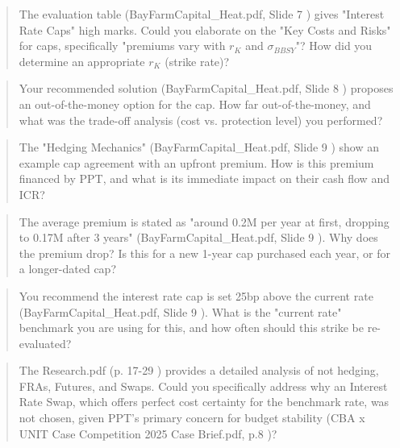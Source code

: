 \documentclass[11pt, a4paper, british]{article}
\begin{document}
\newpage

\begin{quote}
    The evaluation table (BayFarmCapital_Heat.pdf, Slide 7 ) gives "Interest Rate Caps" high marks. Could you elaborate on the "Key Costs and Risks" for caps, specifically "premiums vary with $r_K$ and $\sigma_{BBSY}$"? How did you determine an appropriate $r_K$ (strike rate)?
\end{quote}

\newpage

\begin{quote}
    Your recommended solution (BayFarmCapital_Heat.pdf, Slide 8 ) proposes an out-of-the-money option for the cap. How far out-of-the-money, and what was the trade-off analysis (cost vs. protection level) you performed?
\end{quote}

\newpage

\begin{quote}
    The "Hedging Mechanics" (BayFarmCapital_Heat.pdf, Slide 9 ) show an example cap agreement with an upfront premium. How is this premium financed by PPT, and what is its immediate impact on their cash flow and ICR?
\end{quote}

\newpage

\begin{quote}
    The average premium is stated as "around 0.2M per year at first, dropping to 0.17M after 3 years" (BayFarmCapital_Heat.pdf, Slide 9 ). Why does the premium drop? Is this for a new 1-year cap purchased each year, or for a longer-dated cap?
\end{quote}

\newpage

\begin{quote}
    You recommend the interest rate cap is set 25bp above the current rate (BayFarmCapital_Heat.pdf, Slide 9 ). What is the "current rate" benchmark you are using for this, and how often should this strike be re-evaluated?
\end{quote}

\newpage

\begin{quote}
    The Research.pdf (p. 17-29 ) provides a detailed analysis of not hedging, FRAs, Futures, and Swaps. Could you specifically address why an Interest Rate Swap, which offers perfect cost certainty for the benchmark rate, was not chosen, given PPT's primary concern for budget stability (CBA x UNIT Case Competition 2025 Case Brief.pdf, p.8 )?
\end{quote}
\end{document}

